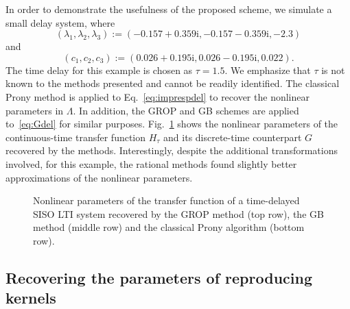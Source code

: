\documentclass{arxiv}
\newcommand{\ri}{\mathrm{i}}
\begin{document}
In order to demonstrate the usefulness of the proposed scheme, we simulate a small delay system, where
$$
    (\lambda_1,\lambda_2,\lambda_3):= ( -0.157 + 0.359\ri, -0.157 - 0.359\ri, -2.3 )
$$
and 
$$
    (c_1,c_2,c_3) := (0.026 + 0.195\ri, 0.026 - 0.195\ri, 0.022 ).
$$
The time delay for this example is chosen as $\tau = 1.5$.
We emphasize that $\tau$ is not known to the methods presented and cannot be readily identified. The classical Prony method is applied to Eq.~\eqref{eq:imprespdel} to recover the nonlinear parameters in $\Lambda$. In addition, the GROP and GB schemes are applied to~\eqref{eq:Gdel} for similar purposes. Fig.~\ref{fig:poles} shows the nonlinear parameters of  the continuous-time transfer function $H_\tau$ and its discrete-time counterpart $G$ recovered by the methods. Interestingly, despite the additional transformations involved, for this example, the rational methods found slightly better approximations of the nonlinear parameters. 

\begin{figure}[bt]
    \centering
    
    
    
    \caption{Nonlinear parameters of the transfer function of a time-delayed SISO LTI system recovered by the GROP method (top row), the GB method  (middle row) and the classical Prony algorithm (bottom row).}
    \label{fig:poles}
\end{figure}

\subsection{Recovering the parameters of reproducing kernels}
\end{document}
